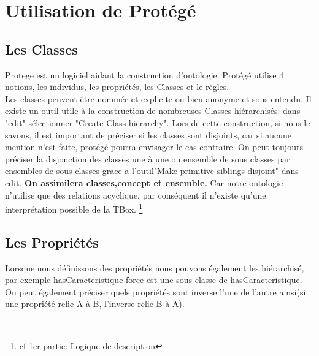 

\section{Utilisation de Protégé}
\label{sec:util-de-prot}

\subsection{Les Classes}

\par Protege est un logiciel aidant la construction d'ontologie.
Protégé utilise 4 notions, les individus, les propriétés, les Classes et le règles.\\
Les classes peuvent être nommée et explicite ou bien anonyme et sous-entendu.
Il existe un outil utile à la construction de nombreuses Classes hiérarchisés: dans "edit" sélectionner "Create Class hierarchy". Lors de cette construction, si nous le savons, il est important de préciser si les classes sont disjoints, car si aucune mention n'est faite, protégé pourra envisager le cas contraire. On peut toujours préciser la disjonction des classes une à une ou ensemble de sous classes par ensembles de sous classes grace a l'outil"Make primitive siblings disjoint" dans edit. \textbf{On assimilera classes,concept et ensemble.} Car notre ontologie n'utilise que des relations acyclique, par conséquent il n'existe qu'une interprétation possible de la TBox. \footnote{cf 1er partie: Logique de description}

\subsection{Les Propriétés}
\par Lorsque nous définissons des propriétés nous pouvons également les hiérarchisé, par exemple hasCaracteristique force est une sous classe de hasCaracteristique. On peut également préciser quels propriétés sont inverse l'une de l'autre ainsi(si une propriété relie A à B, l'inverse relie B à A).\\\\

